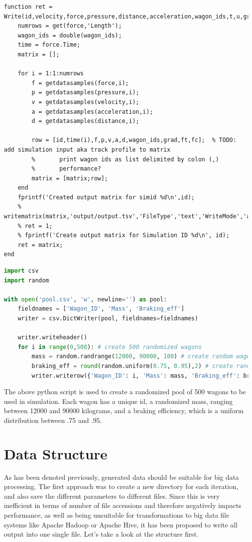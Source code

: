 \begin{lstlisting}
function ret = Write(id,velocity,force,pressure,distance,acceleration,wagon_ids,t,u,grad,ft,fc)
	numrows = get(force,'Length');
	wagon_ids = double(wagon_ids);
	time = force.Time;
	matrix = [];
	
	for i = 1:1:numrows
		f = getdatasamples(force,i);
		p = getdatasamples(pressure,i);
		v = getdatasamples(velocity,i);
		a = getdatasamples(acceleration,i);
		d = getdatasamples(distance,i);
		
		row = [id,time(i),f,p,v,a,d,wagon_ids,grad,ft,fc]; 	% TODO: add simulation input aka track profile to matrix
		%		print wagon ids as list delimited by colon (,)
		%		performance?
		matrix = [matrix;row];
	end
	fprintf('Created output matrix for simid %d\n',id);
	% writematrix(matrix,'output/output.tsv','FileType','text','WriteMode','append','Delimiter','tab');
	% ret = 1;
	% fprintf('Create output matrix for Simulation ID %d\n', id);
	ret = matrix;
end
\end{lstlisting}

\begin{lstlisting}[language=python]
import csv
import random

with open('pool.csv', 'w', newline='') as pool:
	fieldnames = ['Wagon_ID', 'Mass', 'Braking_eff']
	writer = csv.DictWriter(pool, fieldnames=fieldnames)
	
	writer.writeheader()
	for i in range(0,500): # create 500 randomized wagons
		mass = random.randrange(12000, 90000, 100) # create random wagon mass between 12 t and 90 t with step size 100
		braking_eff = round(random.uniform(0.75, 0.95),2) # create random braking efficiency as uniform distribution between 75 % and 95 %
		writer.writerow({'Wagon_ID': i, 'Mass': mass, 'Braking_eff': braking_eff})
\end{lstlisting}

\par\noindent
The above python script is used to create a randomized pool of 500 wagons to be used in simulation. Each wagon has a unique id, a randomized mass, ranging between 12000 and 90000 kilograms, and a braking efficiency, which is a uniform distribution between .75 and .95.

\section{Data Structure}
\label{sec:DataStructure}
\par\noindent
As has been denoted previously, generated data should be suitable for big data processing. The first approach was to create a new directory for each iteration, and also save the different parameters to different files. Since this is very inefficient in terms of number of file accessions and therefore negatively impacts performance, as well as being unsuitable for transformations to big data file systems like Apache Hadoop or Apache Hive, it has been proposed to write all output into one single file. Let's take a look at the structure first.

